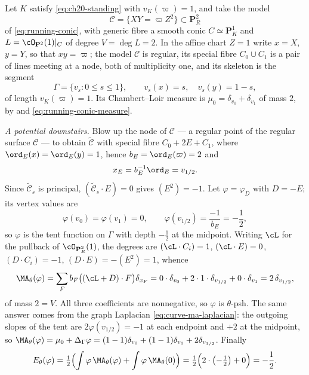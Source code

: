 \begin{example}
\label{ex:ch30-conic-base-change}
Let $K$ satisfy \eqref{eq:ch20-standing} with $v_K(\varpi)=1$, and take
the model
\[
 \mathcal C=\{XY=\varpi Z^2\}\subset\mathbf P^2_R
\]
of \eqref{eq:running-conic}, with generic fibre a smooth conic
$C\simeq\mathbf P^1_K$ and $L=\cO_{\mathbf P^2}(1)|_C$ of degree
$V=\deg L=2$.  In the affine chart $Z=1$ write $x=X$, $y=Y$, so
that $xy=\varpi$; the model $\mathcal C$ is regular, its special fibre
$C_0\cup C_1$ is a pair of lines meeting at a node, both of multiplicity
one, and its skeleton is the segment
\[
 \Gamma=\{v_s:0\leq s\leq1\},
 \qquad v_s(x)=s,\quad v_s(y)=1-s,
\]
of length $v_K(\varpi)=1$.  Its Chambert--Loir measure is
$\mu_0=\delta_{v_0}+\delta_{v_1}$ of mass $2$, by
 and \eqref{eq:running-conic-measure}.

\emph{A potential downstairs.}  Blow up the node of $\mathcal C$ --- a regular
point of the regular surface $\mathcal C$ --- to obtain $\widetilde{\mathcal C}$ with
special fibre $C_0+2E+C_1$, where $\ord_E(x)=\ord_E(y)=1$, hence
$b_E=\ord_E(\varpi)=2$ and
\[
 x_E=b_E^{-1}\ord_E=v_{1/2}.
\]
Since $\widetilde{\mathcal C}_s$ is principal, $(\widetilde{\mathcal C}_s\cdot E)=0$
gives $(E^2)=-1$.  Let $\varphi=\varphi_D$ with $D=-E$; its vertex
values are
\[
 \varphi(v_0)=\varphi(v_1)=0,\qquad
 \varphi(v_{1/2})=\frac{-1}{b_E}=-\frac12,
\]
so $\varphi$ is the tent function on $\Gamma$ with depth $-\tfrac12$
at the midpoint.  Writing $\cL$ for the pullback of
$\cO_{\mathbf P^2_R}(1)$, the degrees are $(\cL\cdot C_i)=1$,
$(\cL\cdot E)=0$, $(D\cdot C_i)=-1$, $(D\cdot E)=-(E^2)=1$, whence
\begin{equation}
\label{eq:ch30-conic-ma-down}
 \MA_\theta(\varphi)
 =\sum_Fb_F\bigl((\cL+D)\cdot F\bigr)\delta_{x_F}
 =0\cdot\delta_{v_0}+2\cdot1\cdot\delta_{v_{1/2}}+0\cdot\delta_{v_1}
 =2\,\delta_{v_{1/2}},
\end{equation}
of mass $2=V$.  All three coefficients are nonnegative, so
$\varphi$ is $\theta$-psh.  The same answer comes from the graph
Laplacian \eqref{eq:curve-ma-laplacian}: the outgoing slopes of the tent
are $2\varphi(v_{1/2})=-1$ at each endpoint and $+2$ at the midpoint,
so $\MA_\theta(\varphi)=\mu_0+\Delta_\Gamma\varphi
=(1-1)\delta_{v_0}+(1-1)\delta_{v_1}+2\delta_{v_{1/2}}$.  Finally
\begin{equation}
\label{eq:ch30-conic-energy-down}
 E_\theta(\varphi)
 =\tfrac12\Bigl(\int\varphi\,\MA_\theta(\varphi)
   +\int\varphi\,\MA_\theta(0)\Bigr)
 =\tfrac12\Bigl(2\cdot\bigl(-\tfrac12\bigr)+0\Bigr)=-\frac12 .
\end{equation}


\end{example}
